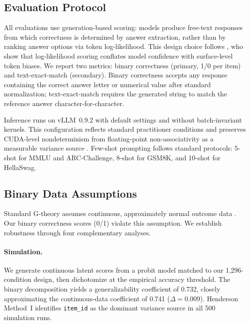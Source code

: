 
\subsection{Evaluation Protocol}
\label{sec:protocol}

All evaluations use generation-based scoring: models produce free-text responses from which correctness is determined by answer extraction, rather than by ranking answer options via token log-likelihood. This design choice follows \citet{hua2025flaw}, who show that log-likelihood scoring conflates model confidence with surface-level token biases. We report two metrics: binary correctness (primary, 1/0 per item) and text-exact-match (secondary). Binary correctness accepts any response containing the correct answer letter or numerical value after standard normalization; text-exact-match requires the generated string to match the reference answer character-for-character.

Inference runs on vLLM~0.9.2 with default settings and without batch-invariant kernels. This configuration reflects standard practitioner conditions and preserves CUDA-level nondeterminism from floating-point non-associativity as a measurable variance source \cite{messina2026background, thinkingmachines2025batch}. Few-shot prompting follows standard protocols: 5-shot for MMLU and ARC-Challenge, 8-shot for GSM8K, and 10-shot for HellaSwag.

\subsection{Binary Data Assumptions}
\label{sec:binary}

Standard G-theory assumes continuous, approximately normal outcome data \cite{shavelson1991generalizability}. Our binary correctness scores (0/1) violate this assumption. We establish robustness through four complementary analyses.

\paragraph{Simulation.} We generate continuous latent scores from a probit model matched to our 1,296-condition design, then dichotomize at the empirical accuracy threshold. The binary decomposition yields a generalizability coefficient of 0.732, closely approximating the continuous-data coefficient of 0.741 ($\Delta = 0.009$). Henderson Method~I identifies \texttt{item\_id} as the dominant variance source in all 500 simulation runs.

